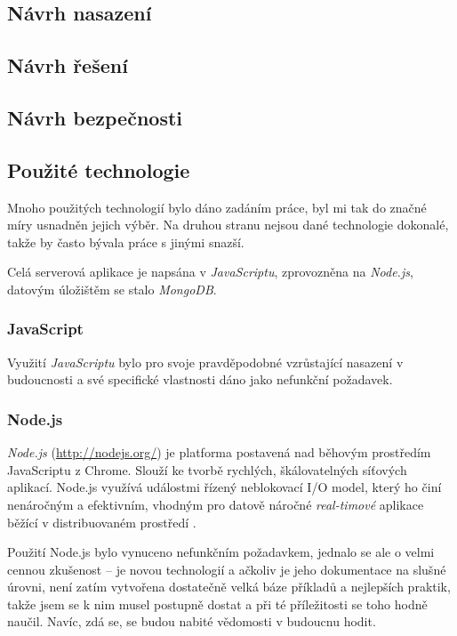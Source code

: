 \subsection{Návrh nasazení}

\subsection{Návrh řešení}


\subsection{Návrh bezpečnosti}

\subsection{Použité technologie}
Mnoho použitých technologií bylo dáno zadáním práce, byl mi tak do značné míry usnadněn jejich výběr. Na druhou stranu nejsou dané technologie dokonalé, takže by často bývala práce s jinými snazší.

Celá serverová aplikace je napsána v \emph{JavaScriptu}, zprovozněna na \emph{Node.js}, datovým úložištěm se stalo \emph{MongoDB}.

\subsubsection{JavaScript}
Využití \emph{JavaScriptu} bylo pro svoje pravděpodobné vzrůstající nasazení v budoucnosti a své specifické vlastnosti dáno jako nefunkční požadavek.

\subsubsection{Node.js}
\emph{Node.js} (\url{http://nodejs.org/}) je platforma postavená nad běhovým prostředím JavaScriptu z Chrome. Slouží ke tvorbě rychlých, škálovatelných síťových aplikací. Node.js využívá událostmi řízený neblokovací I/O model, který ho činí nenáročným a efektivním, vhodným pro datově náročné \textit{real-timové} aplikace běžící v distribuovaném prostředí \cite{Node}.

Použití Node.js bylo vynuceno nefunkčním požadavkem, jednalo se ale o velmi cennou zkušenost -- je novou technologií a ačkoliv je jeho dokumentace na slušné úrovni, není zatím vytvořena dostatečně velká báze příkladů a nejlepších praktik, takže jsem se k nim musel postupně dostat a při té příležitosti se toho hodně naučil. Navíc, zdá se, se budou nabité vědomosti v budoucnu hodit.

